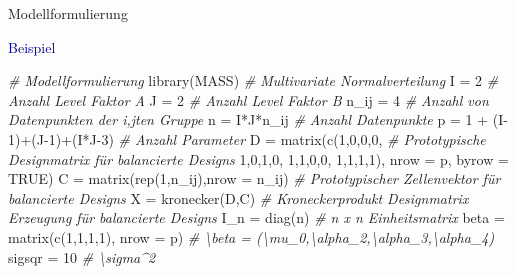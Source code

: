 \documentclass[
  8pt,
  ignorenonframetext,
]{beamer}
\newenvironment{Shaded}{\begin{snugshade}}{\end{snugshade}}
\newcommand{\AttributeTok}[1]{\textcolor[rgb]{0.77,0.63,0.00}{#1}}
\newcommand{\CommentTok}[1]{\textcolor[rgb]{0.56,0.35,0.01}{\textit{#1}}}
\newcommand{\ConstantTok}[1]{\textcolor[rgb]{0.00,0.00,0.00}{#1}}
\newcommand{\DecValTok}[1]{\textcolor[rgb]{0.00,0.00,0.81}{#1}}
\newcommand{\FunctionTok}[1]{\textcolor[rgb]{0.00,0.00,0.00}{#1}}
\newcommand{\NormalTok}[1]{#1}
\newcommand{\OtherTok}[1]{\textcolor[rgb]{0.56,0.35,0.01}{#1}}
\newcommand{\SpecialCharTok}[1]{\textcolor[rgb]{0.00,0.00,0.00}{#1}}
\begin{document}
\begin{frame}[fragile]{Modellformulierung}
\protect\hypertarget{modellformulierung-11}{}
\vspace{2mm}

\textcolor{darkblue}{Beispiel} \vspace{1mm} \tiny {}

\begin{Shaded}
\begin{Highlighting}[]
\CommentTok{\# Modellformulierung}
\FunctionTok{library}\NormalTok{(MASS)                               }\CommentTok{\# Multivariate Normalverteilung}
\NormalTok{I      }\OtherTok{=} \DecValTok{2}                                  \CommentTok{\# Anzahl Level Faktor A}
\NormalTok{J      }\OtherTok{=} \DecValTok{2}                                  \CommentTok{\# Anzahl Level Faktor B}
\NormalTok{n\_ij   }\OtherTok{=} \DecValTok{4}                                  \CommentTok{\# Anzahl von Datenpunkten der i,jten Gruppe}
\NormalTok{n      }\OtherTok{=}\NormalTok{ I}\SpecialCharTok{*}\NormalTok{J}\SpecialCharTok{*}\NormalTok{n\_ij                           }\CommentTok{\# Anzahl Datenpunkte}
\NormalTok{p      }\OtherTok{=} \DecValTok{1} \SpecialCharTok{+}\NormalTok{ (I}\DecValTok{{-}1}\NormalTok{)}\SpecialCharTok{+}\NormalTok{(J}\DecValTok{{-}1}\NormalTok{)}\SpecialCharTok{+}\NormalTok{(I}\SpecialCharTok{*}\NormalTok{J}\DecValTok{{-}3}\NormalTok{)            }\CommentTok{\# Anzahl Parameter}
\NormalTok{D      }\OtherTok{=} \FunctionTok{matrix}\NormalTok{(}\FunctionTok{c}\NormalTok{(}\DecValTok{1}\NormalTok{,}\DecValTok{0}\NormalTok{,}\DecValTok{0}\NormalTok{,}\DecValTok{0}\NormalTok{,                  }\CommentTok{\# Prototypische Designmatrix für balancierte Designs}
                  \DecValTok{1}\NormalTok{,}\DecValTok{0}\NormalTok{,}\DecValTok{1}\NormalTok{,}\DecValTok{0}\NormalTok{,}
                  \DecValTok{1}\NormalTok{,}\DecValTok{1}\NormalTok{,}\DecValTok{0}\NormalTok{,}\DecValTok{0}\NormalTok{,}
                  \DecValTok{1}\NormalTok{,}\DecValTok{1}\NormalTok{,}\DecValTok{1}\NormalTok{,}\DecValTok{1}\NormalTok{),}
                \AttributeTok{nrow  =}\NormalTok{ p,}
                \AttributeTok{byrow =} \ConstantTok{TRUE}\NormalTok{)}
\NormalTok{C      }\OtherTok{=} \FunctionTok{matrix}\NormalTok{(}\FunctionTok{rep}\NormalTok{(}\DecValTok{1}\NormalTok{,n\_ij),}\AttributeTok{nrow =}\NormalTok{ n\_ij)    }\CommentTok{\# Prototypischer Zellenvektor für balancierte Designs}
\NormalTok{X      }\OtherTok{=} \FunctionTok{kronecker}\NormalTok{(D,C)                     }\CommentTok{\# Kroneckerprodukt Designmatrix Erzeugung für balancierte Designs}
\NormalTok{I\_n    }\OtherTok{=} \FunctionTok{diag}\NormalTok{(n)                            }\CommentTok{\# n x n Einheitsmatrix}
\NormalTok{beta   }\OtherTok{=} \FunctionTok{matrix}\NormalTok{(}\FunctionTok{c}\NormalTok{(}\DecValTok{1}\NormalTok{,}\DecValTok{1}\NormalTok{,}\DecValTok{1}\NormalTok{,}\DecValTok{1}\NormalTok{), }\AttributeTok{nrow =}\NormalTok{ p)       }\CommentTok{\# \textbackslash{}beta = (\textbackslash{}mu\_0,\textbackslash{}alpha\_2,\textbackslash{}alpha\_3,\textbackslash{}alpha\_4)}
\NormalTok{sigsqr }\OtherTok{=} \DecValTok{10}                                 \CommentTok{\# \textbackslash{}sigma\^{}2}


\end{Highlighting}
\end{Shaded}
\end{frame}
\end{document}
